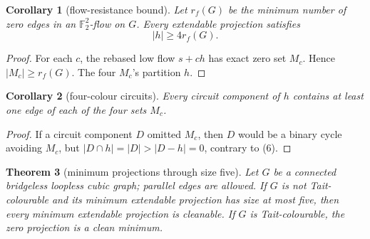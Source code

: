 \documentclass[11pt]{article}
\newtheorem{theorem}{Theorem}[section]
\newtheorem{corollary}[theorem]{Corollary}
\theoremstyle{definition}
\theoremstyle{remark}
\newcommand{\F}{\mathbb F}
\begin{document}
\begin{corollary}[flow-resistance bound]\label{cor:resistance}
Let \(r_f(G)\) be the minimum number of zero edges in an
\(\F_2^2\)-flow on \(G\).  Every extendable projection satisfies
\[
                              |h|\ge4r_f(G).                    \tag{8}
\]
\end{corollary}

\begin{proof}
For each \(c\), the rebased low flow \(s+ch\) has exact zero set \(M_c\).
Hence \(|M_c|\ge r_f(G)\).  The four \(M_c\)'s partition \(h\).
\end{proof}

\begin{corollary}[four-colour circuits]\label{cor:fourcolour}
Every circuit component of \(h\) contains at least one edge of each of the
four sets \(M_c\).
\end{corollary}

\begin{proof}
If a circuit component \(D\) omitted \(M_c\), then \(D\) would be a binary
cycle avoiding \(M_c\), but
\(|D\cap h|=|D|>|D-h|=0\), contrary to (6).
\end{proof}

\begin{theorem}[minimum projections through size five]
\label{thm:sizefive}
Let \(G\) be a connected bridgeless loopless cubic graph; parallel edges
are allowed.  If \(G\) is not Tait-colourable and its minimum extendable
projection has size at most five, then every minimum extendable projection
is cleanable.  If \(G\) is Tait-colourable, the zero projection is a clean
minimum.
\end{theorem}
\end{document}
